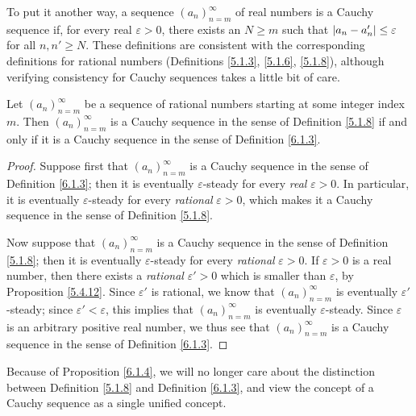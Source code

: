 \begin{note}
To put it another way, a sequence \((a_n)_{n = m}^\infty\) of real numbers is a Cauchy sequence if, for every real \(\varepsilon > 0\), there exists an \(N \geq m\) such that \(\abs*{a_n - a_n'} \leq \varepsilon\) for all \(n, n' \geq N\).
These definitions are consistent with the corresponding definitions for rational numbers (Definitions \ref{5.1.3}, \ref{5.1.6}, \ref{5.1.8}), although verifying consistency for Cauchy sequences takes a little bit of care.
\end{note}

\begin{proposition}\label{6.1.4}
Let \((a_n)_{n = m}^\infty\) be a sequence of rational numbers starting at some integer index \(m\).
Then \((a_n)_{n = m}^\infty\) is a Cauchy sequence in the sense of Definition \ref{5.1.8} if and only if it is a Cauchy sequence in the sense of Definition \ref{6.1.3}.
\end{proposition}

\begin{proof}
Suppose first that \((a_n)_{n = m}^\infty\) is a Cauchy sequence in the sense of Definition \ref{6.1.3};
then it is eventually \(\varepsilon\)-steady for every \emph{real} \(\varepsilon > 0\).
In particular, it is eventually \(\varepsilon\)-steady for every \emph{rational} \(\varepsilon > 0\), which makes it a Cauchy sequence in the sense of Definition \ref{5.1.8}.

Now suppose that \((a_n)_{n = m}^\infty\) is a Cauchy sequence in the sense of Definition \ref{5.1.8};
then it is eventually \(\varepsilon\)-steady for every \emph{rational} \(\varepsilon > 0\).
If \(\varepsilon > 0\) is a real number, then there exists a \emph{rational} \(\varepsilon' > 0\) which is smaller than \(\varepsilon\), by Proposition \ref{5.4.12}.
Since \(\varepsilon'\) is rational, we know that \((a_n)_{n = m}^\infty\) is eventually \(\varepsilon'\)-steady;
since \(\varepsilon' < \varepsilon\), this implies that \((a_n)_{n = m}^\infty\) is eventually \(\varepsilon\)-steady.
Since \(\varepsilon\) is an arbitrary positive real number, we thus see that \((a_n)_{n = m}^\infty\) is a Cauchy sequence in the sense of Definition \ref{6.1.3}.
\end{proof}

\begin{note}
Because of Proposition \ref{6.1.4}, we will no longer care about the distinction between Definition \ref{5.1.8} and Definition \ref{6.1.3}, and view the concept of a Cauchy sequence as a single unified concept.
\end{note}

